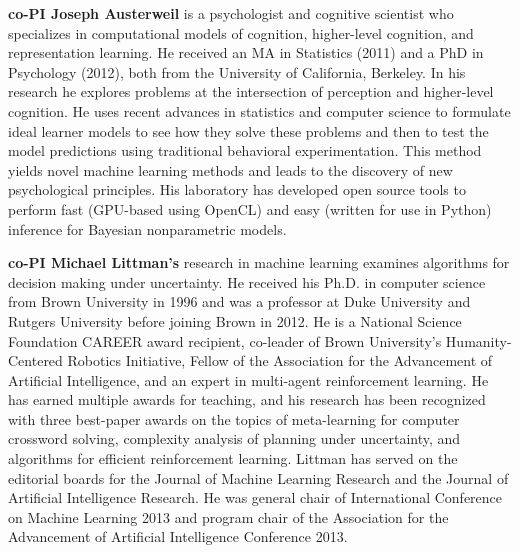 \documentclass[12pt]{article}
\begin{document}
\vspace{1mm}
\noindent \textbf{co-PI Joseph Austerweil} is a psychologist and cognitive scientist who specializes in computational models of cognition, higher-level cognition, and representation learning.  He received an MA in Statistics (2011) and a PhD in Psychology (2012), both from the University of California, Berkeley.   In his research he explores problems at the intersection of perception and higher-level cognition. He uses recent advances in statistics and computer science to formulate ideal learner models to see how they solve these problems and then to test the model predictions using traditional behavioral experimentation.  This method yields novel machine learning methods and leads to the discovery of new psychological principles.  His laboratory has  developed open source tools to perform fast (GPU-based using OpenCL) and easy (written for use in Python) inference for Bayesian nonparametric models.  
 
\vspace{1mm}
\noindent \textbf{co-PI  Michael Littman's} research in machine learning examines algorithms for decision making under uncertainty.   He received his Ph.D. in computer science from Brown University in 1996 and was a professor at Duke University and Rutgers University before joining Brown in 2012. He is a National Science Foundation CAREER award recipient, co-leader of Brown University's  Humanity-Centered Robotics Initiative, Fellow of the Association for the Advancement of Artificial Intelligence, and an expert in multi-agent reinforcement learning.  He has earned multiple awards for teaching, and his research has been recognized with three best-paper awards on the topics of meta-learning for computer crossword solving, complexity analysis of planning under uncertainty, and algorithms for efficient reinforcement learning.  Littman has served on the editorial boards for the Journal of Machine Learning Research and the Journal of Artificial Intelligence Research.  He was general chair of International Conference on Machine Learning 2013 and program chair of the Association for the Advancement of Artificial Intelligence Conference 2013.
\end{document}
